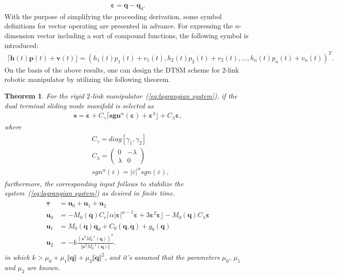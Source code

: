 \documentclass[3p]{elsarticle}
\theoremstyle{plain}
\newtheorem{mythm}{Theorem}
\theoremstyle{remark}
\begin{document}
\begin{align}
\bm \varepsilon = \bm q -\bm q_d.
\end{align}
With the purpose of simplifying the proceeding derivation, some symbol definitions for vector operating are presented in advance. For expressing the $n$-dimension vector including a sort of compound functions, the following symbol is introduced:
\begin{align*}
\lceil\bm h(t)\bm p(t)+\bm v(t)\rfloor = (h_1(t)p_1(t)+v_1(t),h_2(t)p_2(t)+v_2(t),\ldots,h_n(t)p_n(t)+v_n(t))^T.
\end{align*}
On the basis of the above results, one can design the DTSM scheme for $2$-link robotic manipulator by utilizing the following theorem.
\begin{mythm}\label{theorem:4}
For the rigid $2$-link manipulator~(\ref{eq:lagrangian system}), if the dual terminal sliding mode manifold is selected as
\begin{align}
\bm s = \dot{\bm \varepsilon}+C_\gamma\lceil\bm{sgn}^\alpha(\bm \varepsilon)+\bm\varepsilon^3\rfloor+C_\lambda{\bm\varepsilon},\label{eq:lagrangian manifold}
\end{align}
where
\begin{align}
\begin{split}
&C_\gamma=diag[\gamma_1,\gamma_2]\\
&C_\lambda=
\begin{pmatrix}
0 &-\lambda\\ \lambda &0
\end{pmatrix}\\
&{sgn}^\alpha(\varepsilon)=\vert\varepsilon\vert^\alpha sgn(\varepsilon),
\end{split}
\end{align}
furthermore, the corresponding input follows to stabilize the system~(\ref{eq:lagrangian system}) as desired in finite time.
\begin{align}
\begin{split}
\bm\tau &= \bm u_0+\bm u_1 +\bm u_2\\
\bm u_0 &= -M_0(\bm q)C_r\lceil\alpha\vert\bm\varepsilon\vert^{\alpha-1}\dot{\bm \varepsilon}+3\bm \varepsilon^2\dot{\bm \varepsilon}\rfloor-M_0(\bm q)C_\lambda\dot{\bm \varepsilon}\\
\bm u_1 &= M_0(\bm q)\ddot {\bm q}_d+C_0(\bm q,\dot {\bm q})+g_0(\bm q)\\
\bm u_2 &= -k\frac{(\bm s^TM_0^{-1}(\bm q))^T}{\Vert\bm s^TM_0^{-1}(\bm q)\Vert}.
\end{split}
\end{align}
in which $k>\mu_0+\mu_1\Vert\bm q\Vert+\mu_2\Vert\dot{\bm q}\Vert^2$, and it's assumed that the parameters $\mu_0$, $\mu_1$ and $\mu_2$ are known.
\end{mythm}
\end{document}

